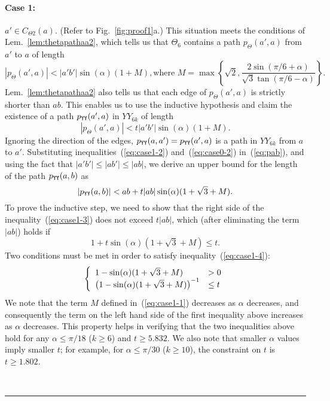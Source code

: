 \documentclass[11pt]{article}
\newcommand\cone{{C}}
\newcommand\pyy{p_{{\tt YY}}}
\newcommand{\qed}{\rule{0.5em}{1.5ex}}
\newcommand{\fqed}{{\hfill~\qed}}
\newenvironment{proof}{{\noindent \bf Proof.}}
                      {{\hfill \fqed} \vspace{1em}}
\begin{document}
\begin{proof}
\paragraph{Case 1:} $a' \in \cone_{\Theta2}(a)$. (Refer to Fig.~\ref{fig:proof1}a.) This situation meets the conditions of Lem.~\ref{lem:thetapathaa2}, which tells us that $\Theta_{6}$ contains a path $p_\Theta(a',a)$ from $a'$ to $a$ of length
\begin{equation}
|p_\Theta(a',a)| < |a'b'|\sin(\alpha)(1 + M), \mbox{where }
M = \max\left\{\sqrt{2},\frac{2\sin(\pi/6+\alpha)}{\sqrt{3}\tan(\pi/6-\alpha)}\right\}.
\label{eq:case1-1}
\end{equation}
Lem.~\ref{lem:thetapathaa2} also tells us that each edge of $p_\Theta(a',a)$ is strictly shorter than $ab$. This enables us to use the inductive hypothesis and claim the existence of a path $\pyy(a',a)$ in $YY_{6k}$ of length
\begin{equation}
|p_\Theta(a',a)| < t|a'b'|\sin(\alpha)(1+M).
\label{eq:case1-2}
\end{equation}
Ignoring the direction of the edges, $\pyy(a,a') = \pyy(a',a)$ is a path in $YY_{6k}$ from $a$ to $a'$.
Substituting inequalities~(\ref{eq:case1-2}) and~(\ref{eq:case0-2}) in~(\ref{eq:pab}), and using the fact that
$|a'b'| \le |ab'| \le |ab|$, we derive an upper bound for the length of the path $\pyy(a, b)$ as
\begin{equation}
|\pyy(a,b)| < ab + t|ab|\sin(\alpha)(1 + \sqrt{3} + M).
\label{eq:case1-3}
\end{equation}
To prove the inductive step, we need to show that the right side of the inequality~(\ref{eq:case1-3}) does not exceed $t|ab|$, which (after eliminating the term $|ab|$) holds if
\begin{equation}
1 + t\sin(\alpha)(1+\sqrt{3}+ M) \le t.
\label{eq:case1-4}
\end{equation}
Two conditions must be met in order to satisfy inequality~(\ref{eq:case1-4}):
\[
  \left\{
  \begin{array}{l l}
   1-\sin(\alpha)(1+\sqrt{3}+ M) & > 0 \\
   \left(1-\sin(\alpha)(1+\sqrt{3}+M)\right)^{-1} & \le t\\
  \end{array} \right.
\]
We note that the term $M$ defined in~(\ref{eq:case1-1}) decreases as $\alpha$ decreases, and consequently the term on the left hand side of the first inequality above increases as $\alpha$ decreases. This property helps in verifying that the two inequalities above hold for any $\alpha \le \pi/18$ ($k \ge 6$) and $t \ge 5.832$. We also note that smaller $\alpha$ values imply smaller $t$; for example, for $\alpha \le \pi/30$ ($k \ge 10$), the constraint on $t$ is $t \ge 1.802$.


\end{proof}
\end{document}
